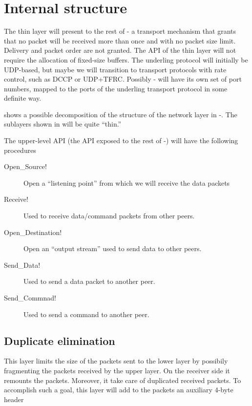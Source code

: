 \documentclass{medusabook}
\begin{document}
\section{Internal structure}
\label{sect:2.1;dsp_book}

The thin layer will present to the rest of \medusa- a transport
mechanism that grants that no packet will be received more than once
and with no packet size limit.  Delivery and packet order are not
granted.  The API of the thin layer will not require the allocation of
fixed-size buffers.  The underling protocol will initially be
UDP-based, but maybe we will transition to transport protocols with
rate control, such as DCCP or UDP+TFRC.  Possibly \medusa- will have
its own set of port numbers, mapped to the ports of the underling
transport protocol in some definite way.

 shows a possible decomposition of the structure
of the network layer in \medusa-.  The sublayers shown in
 will be quite ``thin.''

\begin{figure}
\centerline{}
\caption{
\label{fig:network_layers}}
\end{figure}
%
The upper-level API (the API exposed to the rest of \medusa-) will
have the following procedures

\begin{description}
  \item[{\ttt Open\_Source!}]  Open a ``listening point'' from which we
  will receive the data packets
  \item[{\ttt Receive!}] Used to receive data/command packets from
  other peers.
  \item[{\ttt Open\_Destination!}] Open an ``output stream'' used to
  send data to other peers.  
  \item[{\ttt Send\_Data!}] Used to send a data packet to another peer.
  \item[{\ttt Send\_Commnad!}] Used to send a command to another peer.
\end{description}

\subsection{Duplicate elimination}
\label{sub:2.1.1;dsp_book}

This layer limits the size of the packets sent to the lower layer by
possibily fragmenting the packets received by the upper layer.  On the
receiver side it remounts the packets.  Moreover, it take care of
duplicated received packets.  To accomplish such a goal, this layer
will add to the packets an auxiliary 4-byte header
\end{document}
